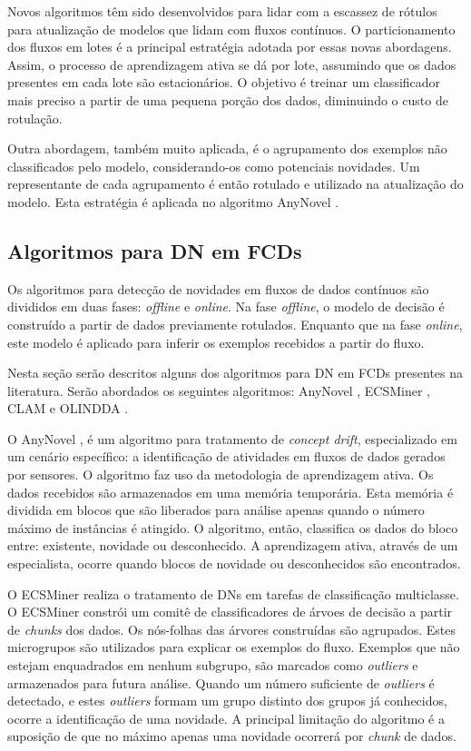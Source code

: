 \documentclass[qual, classic, a4paper]{ufbathesis}
\begin{document}
Novos algoritmos têm sido desenvolvidos para lidar com a escassez de rótulos para atualização de modelos que lidam com fluxos contínuos. 
O particionamento dos fluxos em lotes é a principal estratégia adotada por essas novas abordagens. Assim, o processo de aprendizagem ativa se dá por lote, assumindo que os dados presentes em cada lote são estacionários. O objetivo é treinar um classificador mais preciso a partir de uma pequena porção dos dados, diminuindo o custo de rotulação.

Outra abordagem, também muito aplicada, é o agrupamento dos exemplos não classificados pelo modelo, considerando-os como potenciais novidades. Um representante de cada agrupamento é então rotulado e utilizado na atualização do modelo. Esta estratégia é aplicada no algoritmo AnyNovel \cite{Abdallah}.

\subsection{Algoritmos para DN em FCDs}

Os algoritmos para detecção de novidades em fluxos de dados contínuos são divididos em duas fases: \textit{offline} e \textit{online}. Na fase \textit{offline}, o modelo de decisão é construído a partir de dados previamente rotulados. Enquanto que na fase \textit{online}, este modelo é aplicado para inferir os exemplos recebidos a partir do fluxo. 

Nesta seção serão descritos alguns dos algoritmos para DN em FCDs presentes na literatura. Serão abordados os seguintes algoritmos: AnyNovel \cite{Abdallah}, ECSMiner \cite{Masud:2010:ACC:1933307.1934606}, CLAM \cite{malkhateeb} e OLINDDA \cite{Spinosa:2009:NDA:1551768.1551770}.

O AnyNovel \cite{Abdallah}, é um algoritmo para tratamento de \textit{concept drift}, especializado em um cenário específico: a identificação de atividades em fluxos de dados gerados por sensores. O algoritmo faz uso da metodologia de aprendizagem ativa. Os dados recebidos são armazenados em uma memória temporária. Esta memória é dividida em blocos que são liberados para análise apenas quando o número máximo de instâncias é atingido. O algoritmo, então, classifica os dados do bloco entre: existente, novidade ou desconhecido. A aprendizagem ativa, através de um especialista, ocorre quando blocos de novidade ou desconhecidos são encontrados.

O ECSMiner \cite{Masud:2010:ACC:1933307.1934606} realiza o tratamento de DNs em tarefas de classificação multiclasse. O ECSMiner constrói um comitê de classificadores de árvoes de decisão a partir de \textit{chunks} dos dados. Os nós-folhas das árvores construídas são agrupados.
Estes microgrupos são utilizados para explicar os exemplos do fluxo. Exemplos que não estejam enquadrados em nenhum subgrupo, são marcados como \textit{outliers} e armazenados para futura análise. 
Quando um número suficiente de \textit{outliers} é detectado, e estes \textit{outliers} formam um grupo distinto dos grupos já conhecidos, ocorre a identificação de uma novidade. A principal limitação do algoritmo é a suposição de que no máximo apenas uma novidade ocorrerá por \textit{chunk} de dados.
\end{document}

